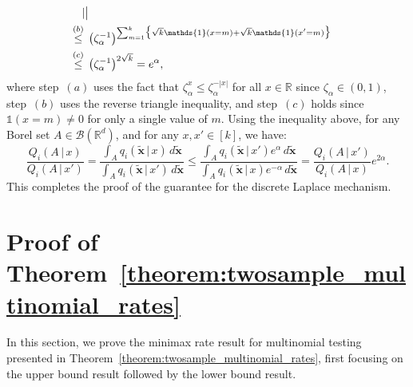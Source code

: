 \documentclass[twoside,11pt]{article}
\newcommand{\vectorize}[1]{\mathbf{#1}}
\newcommand{\private}[1]{\tilde{#1}}
\newcommand{\rvXRealized}{x}
\newcommand{\alphabetSize}{k} %
\newcommand{\vectorIndex}{m}
\newcommand{\privacyParameter}{\alpha} %
\newcommand{\distparamDiscLap}{\zeta}%
\newcommand{\discLapUParam}{\distparamDiscLap_{\privacyParameter}}
\begin{document}
\begin{appendix}
\begin{align*}
{			|
			\bigr|
		}
		\\ \stackrel{(b)}{\leq} \hskip 1.57mm &
		\bigl(
		\discLapUParam^{-1}
		\bigr)^{\sum_{\vectorIndex=1}^\alphabetSize 
			\bigl\{
			\sqrt{\alphabetSize} \mathds{1}(\rvXRealized = \vectorIndex)
			+
			\sqrt{\alphabetSize} \mathds{1}(\rvXRealized' =\vectorIndex)
			\bigr\}
		}
		\\ \stackrel{(c)}{\leq} \hskip 1.57mm &
		\bigl(
		\discLapUParam^{-1}
		\bigr)^{2\sqrt{\alphabetSize}} = e^{\privacyParameter},
	\end{align*}
	where step~$(a)$ uses the fact that $\discLapUParam^x \leq \discLapUParam^{-|x|}$ for all $x \in \mathbb{R}$ since $\discLapUParam \in (0,1)$, step~$(b)$ uses the reverse triangle inequality,
	and step~$(c)$ holds since
	$\mathds{1}(\rvXRealized = \vectorIndex) \neq 0$ for only a single value of $\vectorIndex$. Using  the inequality above, for any Borel set $A \in \mathcal{B}(\mathbb{R}^d)$, and for any $x, x' \in [k]$, we have:
	\begin{equation*}
		\frac{Q_i( A \,|\,  x)}{Q_i(A \,|\,  x')}
		= 
		\frac{\int_A q_{i}(\private{\vectorize{x}} \,|\, x) \, d\private{\vectorize{x}} 
		}{
			\int_A q_{i}(\private{\vectorize{x}} \,|\, x') \, d\private{\vectorize{x}}}
		\leq 
		\frac{\int_A q_{i}(\private{\vectorize{x}} \,|\, x') e^{\alpha} \, d\private{\vectorize{x}}
		}{
			\int_A q_{i}(\private{\vectorize{x}} \,|\, x) e^{-\alpha} \, d\private{\vectorize{x}}} = 
		\frac{Q_i( A \,|\,  x')}{Q_i(A \,|\,  x)}e^{2\alpha}.
	\end{equation*}
	This completes the proof of the guarantee for the discrete Laplace mechanism. 
	
	
	\section{Proof of Theorem~\ref{theorem:twosample_multinomial_rates}}\label{proof:twosample_multinomial_rates}
	
	In this section, we prove the minimax rate result for multinomial testing presented in Theorem~\ref{theorem:twosample_multinomial_rates}, first focusing on the upper bound result followed by the lower bound result. 
	

\end{appendix}
\end{document}
